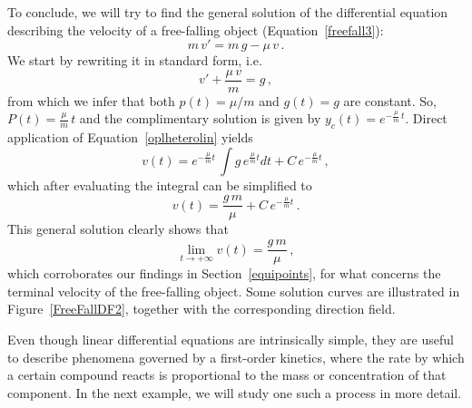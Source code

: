 \begin{example}
To conclude, we will try to find the general solution of the differential equation describing the velocity of a free-falling object (Equation~\eqref{freefall3}):
$$
m\,v'=m\,g-\mu\,v\,.
$$
We start by rewriting it in standard form, i.e.
$$
v'+\dfrac{\mu\,v}{m}=g\,,
$$
from which we infer that both $p(t)=\mu/m$ and $g(t)=g$ are constant. So, $P(t)=\frac{\mu}{m}\,t$ and the complimentary solution is given by $y_c(t)=e^{-\frac{\mu}{m}\,t}$. Direct application of Equation~\eqref{oplheterolin} yields
$$
v(t)=e^{-\frac{\mu}{m}t}\,\displaystyle\int g\,e^{\frac{\mu}{m}t}d t+C\,e^{-\frac{\mu}{m}t}\,,
$$
which after evaluating the integral can be simplified to
$$
v(t)=\frac{g\,m}{\mu}+C\,e^{-\frac{\mu}{m}t}\,.
$$
This general solution clearly shows that 
$$
\lim_{t\to+\infty}v(t)=\dfrac{g\,m}{\mu}\,,
$$
which corroborates our findings in Section~\ref{equipoints}, for what concerns the terminal velocity of the free-falling object. Some solution curves are illustrated in Figure~\ref{FreeFallDF2}, together with the corresponding direction field. 

\end{example}


Even though linear differential equations are intrinsically simple, they are useful to describe phenomena governed by a first-order kinetics, where the rate by which a certain compound reacts is proportional to the mass or concentration of that component. In the next example, we will study one such a process in more detail. 

